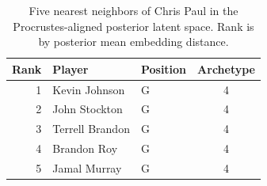 \begin{table}[htbp]
  \centering\small
  \begin{tabular}{rllc}
    \toprule
    Rank & Player & Position & Archetype \\
    \midrule
    1 & Kevin Johnson & G & 4 \\
    2 & John Stockton & G & 4 \\
    3 & Terrell Brandon & G & 4 \\
    4 & Brandon Roy & G & 4 \\
    5 & Jamal Murray & G & 4 \\
    \bottomrule
  \end{tabular}
  \caption{Five nearest neighbors of Chris Paul in the Procrustes-aligned posterior latent space. Rank is by posterior mean embedding distance.}
  \label{tab:Chris_Paul_neighbors}
\end{table}

